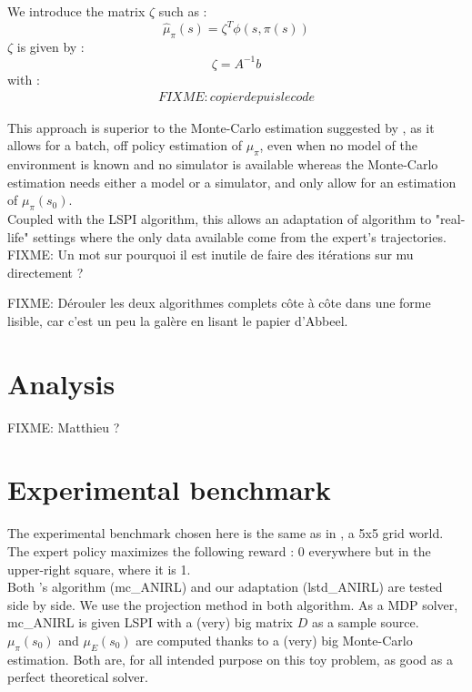\documentclass{article}
\begin{document}
We introduce the matrix $\zeta$ such as :
\begin{equation}
\hat \mu_\pi (s) = \zeta^T\phi(s,\pi(s))
\end{equation}
$\zeta$ is given by :
\begin{equation}
\zeta = A^{-1}b
\end{equation}
with :
\begin{eqnarray}
FIXME: copier depuis le code
\end{eqnarray}

This approach is superior to the Monte-Carlo estimation suggested by \citet{abbeel2004apprenticeship}, as it allows for a batch, off policy estimation of $\mu_\pi$, even when no model of the environment is known and no simulator is available whereas the Monte-Carlo estimation needs either a model or a simulator, and only allow for an estimation of $\mu_\pi(s_0)$.\\

Coupled with the LSPI algorithm, this allows an adaptation of \citet{abbeel2004apprenticeship} algorithm to "real-life" settings where the only data available come from the expert's trajectories.\\

FIXME: Un mot sur pourquoi il est inutile de faire des itérations sur mu directement ?

FIXME: Dérouler les deux algorithmes complets côte à côte dans une forme lisible, car c'est un peu la galère en lisant le papier d'Abbeel.
\section{Analysis}
FIXME: Matthieu ?
\section{Experimental benchmark}
The experimental benchmark chosen here is the same as in \citep{ng2000algorithms}, a 5x5 grid world. The expert policy maximizes the following reward : 0 everywhere but in the upper-right square, where it is 1.\\

Both \cite{abbeel2004apprenticeship}'s algorithm (mc\_ANIRL) and our adaptation (lstd\_ANIRL) are tested side by side. We use the projection method in both algorithm. As a MDP solver, mc\_ANIRL is given LSPI with a (very) big matrix $D$ as a sample source. $\mu_\pi(s_0)$ and $\mu_E(s_0)$ are computed thanks to a (very) big Monte-Carlo estimation. Both are, for all intended purpose on this toy problem, as good as a perfect theoretical solver.\\
\end{document}
